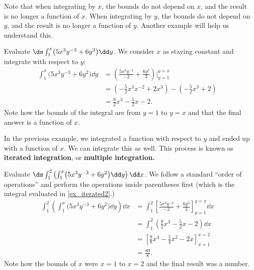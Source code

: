 Note that when integrating by $x$, the bounds do not depend on $x$, and the result is no longer a function of $x$.  When integrating by $y$, the bounds do not depend on $y$, and the result is no longer a function of $y$. Another example will help us understand this.

\begin{example}\label{ex_iterated2}
Evaluate $\ds \int_1^x\bigl(5x^3y^{-3}+6y^2\bigr)\dd y$.
\solution
We consider $x$ as staying constant and integrate with respect to $y$:
\begin{align*}
\int_1^x\bigl(5x^3y^{-3}+6y^2\bigr)\dd y & = \left(\frac{5x^3y^{-2}}{-2}+\frac{6y^3}{3}\right)\Bigg|_{y=1}^{y=x} \\
						&= \left(-\frac52x^3x^{-2}+2x^3\right) - \left(-\frac52x^3+2\right) \\
						&= \frac92x^3-\frac52x-2.
\end{align*}
Note how the bounds of the integral are from $y=1$ to $y=x$ and that the final answer is a function of $x$.
\end{example}

In the previous example, we integrated a function with respect to $y$ and ended up with a function of $x$. We can integrate this as well. This process is known as \textbf{iterated integration}, or \textbf{multiple integration.}


\begin{example}\label{ex_iterated3}
Evaluate $\ds \int_1^2\left(\int_1^x\bigl(5x^3y^{-3}+6y^2\bigr)\dd y\right)\dd x$.
\solution
We follow a standard ``order of operations'' and perform the operations inside parentheses first (which is the integral evaluated in \autoref{ex_iterated2}.)
\begin{align*}
\int_1^2\left(\int_1^x\bigl(5x^3y^{-3}+6y^2\bigr)\dd y\right)\dd x
	&= \int_1^2 \left[\frac{5x^3y^{-2}}{-2}+\frac{6y^3}{3}\right]_{y=1}^{y=x}\dd x \\
	&= \int_1^2 \left(\frac92x^3-\frac52x-2\right)\dd x \\
	&= \left[\frac98x^4-\frac54x^2-2x\right]_{x=1}^{x=2}\\
	&= \frac{89}8.
\end{align*}
Note how the bounds of $x$ were $x=1$ to $x=2$ and the final result was a number.
\end{example}

